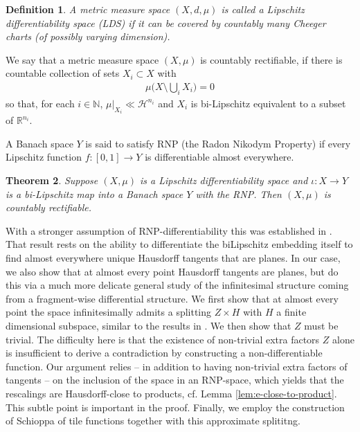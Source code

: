 \documentclass{amsart}
\newtheorem{theorem}{Theorem}[section]
\newtheorem{definition}[theorem]{Definition}
\numberwithin{equation}{section}
\newcommand{\R}{\mathbb{R}}
\newcommand{\N}{\mathbb{N}}
\newcommand{\Ha}{\mathcal{H}}
\begin{document}
\begin{definition}\label{def:LDS}
    A metric measure space $(X,d,\mu)$ is called a Lipschitz differentiability space (LDS) if it can be covered by countably many Cheeger charts (of possibly varying dimension).
\end{definition}


We say that a metric measure space $(X,\mu)$ is countably rectifiable, if there is countable collection of sets $X_i\subset X$ with 
\begin{align*}
	\mu\Big(X\setminus \bigcup_iX_i\Big)=0
\end{align*}
so that, for each $i\in\N$, $\mu|_{X_i}\ll\Ha^{n_i}$ and $X_i$ is bi-Lipschitz equivalent to a subset of $\R^{n_i}$.

A Banach space $Y$ is said to satisfy RNP (the Radon Nikodym Property) if every Lipschitz function $f:[0,1]\to Y$ is differentiable almost everywhere.

\begin{theorem}\label{thm:LDS-in-RNP}
Suppose $(X,\mu)$ is a Lipschitz differentiability space and $\iota:X\to Y$ is a bi-Lipschitz map into a Banach space $Y$ with the RNP. Then $(X,\mu)$ is countably rectifiable.
\end{theorem}

With a stronger assumption of RNP-differentiability this was established in  \cite[Theorem 1.6]{cheegerkleiner}. That result rests on the ability to differentiate the biLipschitz embedding itself to find almost everywhere unique Hausdorff tangents that are planes. In our case, we also show that at almost every point Hausdorff tangents are planes, but do this via a much more delicate general study of the infinitesimal structure coming from a fragment-wise differential structure. We first show that at almost every point the space infinitesimally admits a splitting $Z\times H$ with $H$ a finite dimensional subspace, similar to the results in \cite{davideb20}. We then show that $Z$ must be trivial. The difficulty here is that the existence of non-trivial extra factors $Z$ alone is insufficient to derive a contradiction by constructing a non-differentiable function. Our argument relies -- in addition to having non-trivial extra factors of tangents -- on the inclusion of the space in an RNP-space, which yields that the rescalings are Hausdorff-close to products, cf. Lemma \ref{lem:e-close-to-product}. This subtle point is important in the proof. Finally, we employ the construction of Schioppa \cite{sch16a} of tile functions together with this approximate splititng. 
\end{document}
